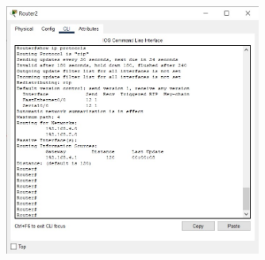 \documentclass{article}
\begin{document}
\begin{figure}[H]
    \centering
    \includegraphics[width=0.75\textwidth]{figures/10.jpg}
    \caption{}
    \label{fig:fig1}
\end{figure}
\end{document}
